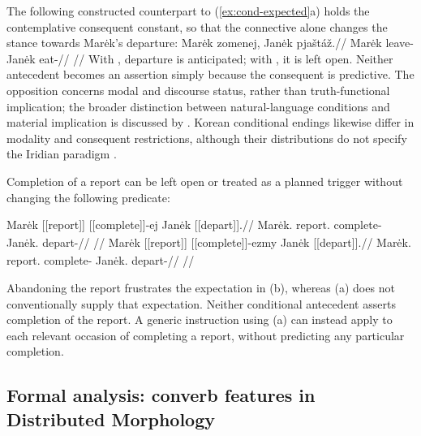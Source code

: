 The following constructed counterpart to (\ref{ex:cond-expected}a) holds the
contemplative consequent constant, so that the connective alone changes the
stance towards Marėk's departure:
\ex\label{ex:cond-constant-consequent}%
\begingl
\gla Marėk zomenej, Janėk pjaštáž.//
\glb Marėk leave-\Cond{} Janėk eat-\Ctpl{}//
\glft {}//
\endgl
\xe
With , departure is anticipated; with , it is
left open. Neither antecedent becomes an assertion simply because the
consequent is predictive. The opposition concerns modal and discourse status,
rather than truth-functional implication; the broader distinction between
natural-language conditions and material implication is discussed by
\cite[ch.~5]{sweetser1990}. Korean conditional endings likewise differ in
modality and consequent restrictions, although their distributions do not
specify the Iridian paradigm \cite[303--306]{sohn2009}.

Completion of a report can be left open or treated as a planned trigger
without changing the following predicate:

\pex\label{ex:slot-condition-expectation}
\a
\begingl
\gla Marėk \textnormal{[[report]]}\textsubscript{\Ind{}} [[complete]]-ej Janėk \textnormal{[[depart]]}\textsubscript{\Ctpl{}}.//
\glb Marėk.\Dir{} report.\Ind{} complete-\Cond{} Janėk.\Dir{} depart-\Ctpl{}//
\glft {}
//
\endgl
\a
\begingl
\gla Marėk \textnormal{[[report]]}\textsubscript{\Ind{}} [[complete]]-ezmy Janėk \textnormal{[[depart]]}\textsubscript{\Ctpl{}}.//
\glb Marėk.\Dir{} report.\Ind{} complete-\ECond{} Janėk.\Dir{} depart-\Ctpl{}//
\glft {}
//
\endgl
\xe

Abandoning the report frustrates the expectation in (b), whereas (a)
does not conventionally supply that expectation. Neither conditional
antecedent asserts completion of the report. A generic instruction using
(a) can instead apply to each relevant occasion
of completing a report, without predicting any particular completion.

\subsection{Formal analysis: converb features in Distributed Morphology}\label{sec:cond-dm}

